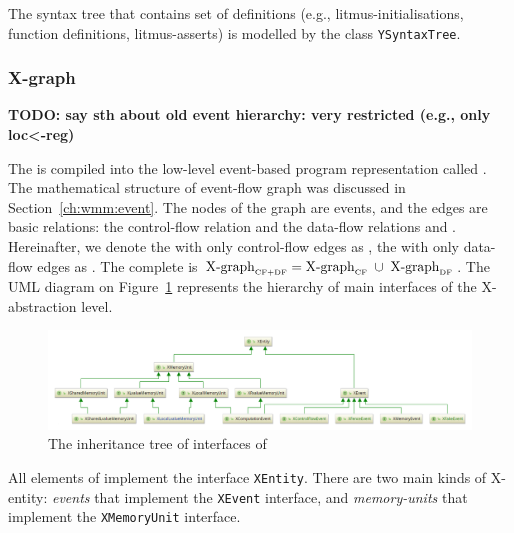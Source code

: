 The syntax tree that contains set of definitions (e.g., litmus-initialisations, function definitions, litmus-asserts) is modelled by the class \texttt{YSyntaxTree}.


\subsubsection{X-graph}
\label{ch:impl:model:xgraph}

\textbf{TODO: say sth about old event hierarchy: very restricted (e.g., only loc<-reg)}

The \ytree{} is compiled into the low-level event-based program representation called \textit{\xgraph{}}.
The mathematical structure of event-flow graph was discussed in Section~\ref{ch:wmm:event}.
The nodes of the graph are events, and the edges are basic relations: the control-flow relation \po{} and the data-flow relations \co{} and \rf{}.
Hereinafter, we denote the \xgraph{} with only control-flow edges as \xgraph[CF], the \xgraph{} with only data-flow edges as \xgraph[CF].
The complete \xgraph{} is $\xgraph[CF+DF] = \xgraph[CF] \; \cup \; \xgraph[DF]$.
The UML diagram on Figure~\ref{fig:class-diagrams:XEntity-interfaces} represents the hierarchy of main interfaces of the X-abstraction level.


\begin{figure}[t]%
  \centering
  \includegraphics[width=\textwidth,keepaspectratio]{img/my/class-diagrams/XEntity-interfaces.png}
  \caption{The inheritance tree of interfaces of \xgraph{}}
  \label{fig:class-diagrams:XEntity-interfaces}
\end{figure}

All elements of \xgraph{} implement the interface \texttt{XEntity}.
There are two main kinds of X-entity: \textit{events} that implement the \texttt{XEvent} interface, and \textit{memory-units} that implement the \texttt{XMemoryUnit} interface.

